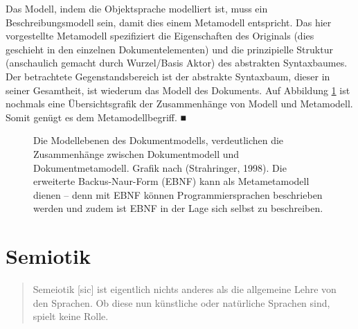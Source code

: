  
Das Modell, indem die Objektsprache modelliert ist, muss ein Beschreibungsmodell sein, damit dies einem Metamodell entspricht. Das hier vorgestellte Metamodell spezifiziert die Eigenschaften des Originals (dies geschieht in den einzelnen Dokumentelementen) und die prinzipielle Struktur (anschaulich gemacht durch Wurzel/Basis Aktor) des abstrakten Syntaxbaumes. Der betrachtete Gegenstandsbereich ist der abstrakte Syntaxbaum, dieser in seiner Gesamtheit, ist wiederum das Modell des Dokuments. Auf Abbildung \ref{metamodellschema} ist nochmals eine Übersichtsgrafik der Zusammenhänge von Modell und Metamodell. Somit genügt es dem Metamodellbegriff. ■

 
\begin{figure}[h!]
\centering
\advance\leftskip-2.5cm
\caption[Modellebenen des Dokumentmodells]{ Die Modellebenen des Dokumentmodells, verdeutlichen die Zusammenhänge zwischen Dokumentmodell und Dokumentmetamodell. Grafik nach (Strahringer, 1998). Die erweiterte Backus-Naur-Form (EBNF) kann als Metametamodell dienen -- denn mit EBNF können Programmiersprachen beschrieben werden und zudem ist EBNF in der Lage sich selbst zu beschreiben. }\label{metamodellschema}
\end{figure}
 
\section{Semiotik}\label{semiotik-sec}
 
\begin{quote}
 Semeiotik [sic] ist eigentlich nichts anderes als die allgemeine Lehre von den Sprachen. Ob diese nun künstliche oder natürliche Sprachen sind, spielt keine Rolle. \citep[S.~8]{Malissa}
\end{quote}
 
